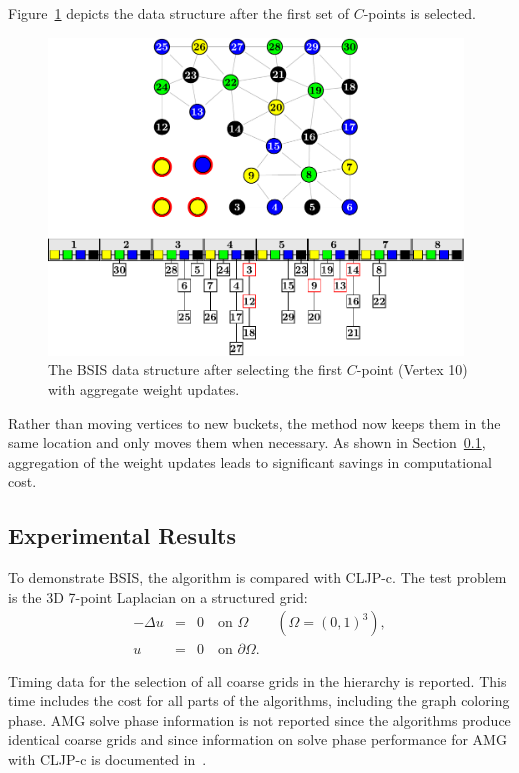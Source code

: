 \documentclass{elsart}
\begin{document}
Figure~\ref{5:fig:cp1-agg} depicts the data structure after the first
set of $C$-points is selected.
\begin{figure}
  \begin{center}
    \includegraphics[width=0.98\textwidth]{images/BSIS/cp1-agg}
    \caption{The BSIS data structure after selecting the first
    $C$-point (Vertex 10) with aggregate weight updates.}
    \label{5:fig:cp1-agg}
  \end{center}
\end{figure}
Rather than moving vertices to new buckets, the method now keeps them
in the same location and only moves them when necessary. As shown in
Section~\ref{5:sec:experiments}, aggregation of the weight updates
leads to significant savings in computational cost.

\subsection{Experimental Results}
\label{5:sec:experiments}
To demonstrate BSIS, the algorithm is compared with CLJP-c. The test
problem is the 3D 7-point Laplacian on a structured grid:
\begin{eqnarray}
\label{5:eqn:Lap} -\Delta u & = & 0 \quad \textrm{on } \Omega \qquad
(\Omega = (0, 1)^3),\\
\nonumber u & = & 0 \quad \textrm{on } \partial \Omega.
\end{eqnarray}

Timing data for the selection of all coarse grids in the hierarchy is
reported. This time includes the cost for all parts of the algorithms,
including the graph coloring phase. AMG solve phase information is not
reported since the algorithms produce identical coarse grids and since
information on solve phase performance for AMG with CLJP-c is
documented in~\cite{alber-cljpc,alber-PCGS}.
\end{document}
